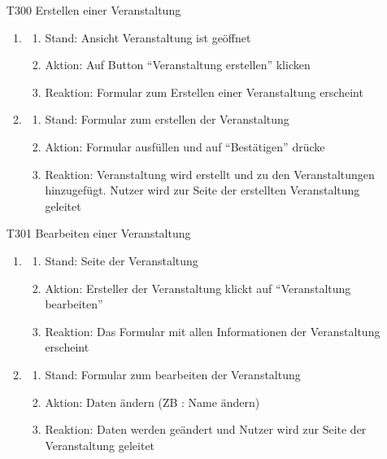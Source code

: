 \documentclass[parskip=full]{scrartcl}
\begin{document}
		\begin{itemize}
			\item[T300] Erstellen einer Veranstaltung
			\begin{enumerate}
				\item
			
				\begin{enumerate}[nosep]
					\item Stand: Ansicht Veranstaltung ist geöffnet
					\item Aktion: Auf Button “Veranstaltung erstellen” klicken
					\item Reaktion: Formular zum Erstellen einer Veranstaltung erscheint
				\end{enumerate}
			\item
				\begin{enumerate}[nosep]	
					\item Stand: Formular zum erstellen der Veranstaltung
					\item Aktion: Formular ausfüllen und auf “Bestätigen” drücke
					\item Reaktion: Veranstaltung wird erstellt und zu den Veranstaltungen hinzugefügt. Nutzer wird zur Seite der erstellten Veranstaltung geleitet
				\end{enumerate}	
		\end{enumerate}
		
		\item[T301] Bearbeiten einer Veranstaltung
		\begin{enumerate}
			\item
			
			\begin{enumerate}[nosep]
				\item Stand: Seite der Veranstaltung
				\item Aktion: Ersteller der Veranstaltung klickt auf  “Veranstaltung bearbeiten”
				\item Reaktion: Das Formular mit allen Informationen der Veranstaltung erscheint
			\end{enumerate}
			\item
			\begin{enumerate}[nosep]	
				\item Stand: Formular zum bearbeiten der Veranstaltung
				\item Aktion: Daten ändern (ZB : Name ändern)
				\item Reaktion: Daten werden geändert und Nutzer wird zur Seite der Veranstaltung geleitet
			\end{enumerate}	
		\end{enumerate}
		

\end{itemize}
\end{document}
